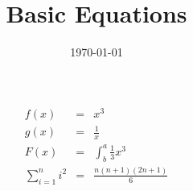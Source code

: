 \documentclass{article}
\begin{document}
	\title{Basic Equations}
	\date{\today}
	\maketitle
	\blindtext
		\begin{eqnarray*}
		f(x)&=&x^3 \\
		g(x)&=&\frac{1}{x}\\
		F(x)&=&\int_{b}^{a} \frac{1}{3}x^3
		\\ \sum_{i=1}^{n} i^2&=&\frac{n(n+1)(2n+1)}{6}	
	\end{eqnarray*}
	\blindtext
\end{document}
